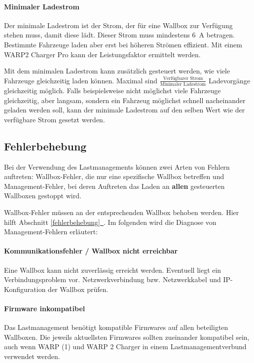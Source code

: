 \documentclass[a4paper,10pt]{article}
\newcommand*{\fullref}[1]{\hyperref[{#1}]{\ref*{#1}~\nameref*{#1}}}
\begin{document}
\begin{multicols*}{2}
	\paragraph{Minimaler Ladestrom}
	Der minimale Ladestrom ist der Strom, der für eine Wallbox zur Verfügung stehen muss, damit diese lädt. Dieser Strom muss mindestens \SI{6}{\ampere} betragen.
	Bestimmte Fahrzeuge laden aber erst bei höheren Strömen effizient. Mit einem WARP2 Charger Pro kann der Leistungsfaktor ermittelt werden.

	Mit dem minimalen Ladestrom kann zusätzlich gesteuert werden, wie viele Fahrzeuge gleichzeitig laden können.
	Maximal sind $\frac{\text{Verfügbarer Strom}}{\text{Minimaler Ladestrom}}$ Ladevorgänge gleichzeitig möglich. Falls beispielsweise nicht möglichst viele
	Fahrzeuge gleichzeitig, aber langsam, sondern ein Fahrzeug möglichst schnell nacheinander geladen werden soll, kann der minimale Ladestrom auf den selben Wert
	wie der verfügbare Strom gesetzt werden.

	\subsection{Fehlerbehebung}
	Bei der Verwendung des Lastmanagements können zwei Arten von Fehlern auftreten: Wallbox-Fehler, die nur eine spezifische Wallbox betreffen und Management-Fehler,
	bei deren Auftreten das Laden an \textbf{allen} gesteuerten Wallboxen gestoppt wird.

	Wallbox-Fehler müssen an der entsprechenden Wallbox behoben werden. Hier hilft Abschnitt \fullref{fehlerbehebung}. Im folgenden wird die Diagnose von Management-Fehlern erläutert:

	\paragraph{Kommunikationsfehler / Wallbox nicht erreichbar}
	Eine Wallbox kann nicht zuverlässig erreicht werden. Eventuell liegt ein Verbindungsproblem vor. Netzwerkverbindung bzw. Netzwerkkabel und IP-Konfiguration der Wallbox prüfen.

	\paragraph{Firmware inkompatibel}
	Das Lastmanagement benötigt kompatible Firmwares auf allen beteiligten Wallboxen. Die jeweils aktuellsten Firmwares sollten zueinander kompatibel sein,
	auch wenn WARP (1) und WARP 2 Charger in einem Lastmanagementverbund verwendet werden.


\end{multicols*}
\end{document}
